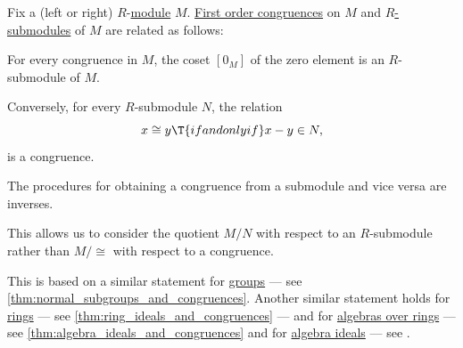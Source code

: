 \begin{proposition}\label{thm:submodules_and_congruences}
  Fix a (left or right) \( R \)-\hyperref[def:module]{module} \( M \). \hyperref[def:fol_congruence]{First order congruences} on \( M \) and \hyperref[def:module/subobject]{\( R \)-submodules} of \( M \) are related as follows:
  \begin{thmenum}
     For every congruence in \( M \), the coset \( [0_M] \) of the zero element is an \( R \)-submodule of \( M \).

     Conversely, for every \( R \)-submodule \( N \), the relation
    \begin{equation}\label{eq:thm:submodules_and_congruences/submodule_to_cong}
      x \cong y \T{if and only if} x - y \in N,
    \end{equation}
    is a congruence.

     The procedures for obtaining a congruence from a submodule and vice versa are inverses.
  \end{thmenum}
\end{proposition}
\begin{comments}
  \item This allows us to consider the quotient \( M / N \) with respect to an \( R \)-submodule rather than \( M / {\cong} \) with respect to a congruence.

  \item This is based on a similar statement for \hyperref[def:group]{groups} --- see \cref{thm:normal_subgroups_and_congruences}. Another similar statement holds for \hyperref[def:ring]{rings} --- see \cref{thm:ring_ideals_and_congruences} --- and for \hyperref[def:algebra_over_ring]{algebras over rings} --- see \cref{thm:algebra_ideals_and_congruences} and for \hyperref[def:algebra_over_ring/ideal]{algebra ideals} --- see .
\end{comments}
